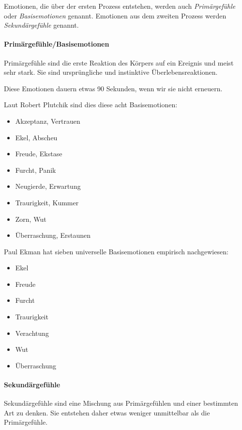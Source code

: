 Emotionen, die über der ersten Prozess entstehen, werden auch \emph{Primärgefühle} oder \emph{Basisemotionen} genannt. Emotionen aus dem zweiten Prozess werden \emph{Sekundärgefühle} genannt.


\paragraph{Primärgefühle/Basisemotionen}

Primärgefühle sind die erste Reaktion des Körpers auf ein Ereignis und meist sehr stark. Sie sind ursprüngliche und instinktive Überlebensreaktionen.

Diese Emotionen dauern etwas 90 Sekunden, wenn wir sie nicht \glqq erneuern\grqq.

Laut Robert Plutchik\cite{plutchik-emotions} sind dies diese acht Basisemotionen:

\begin{itemize}
  \item Akzeptanz, Vertrauen
  \item Ekel, Abscheu
  \item Freude, Ekstase
  \item Furcht, Panik
  \item Neugierde, Erwartung
  \item Traurigkeit, Kummer
  \item Zorn, Wut
  \item Überraschung, Erstaunen
\end{itemize}

Paul Ekman\cite{ekman-emotions} hat sieben universelle Basisemotionen empirisch nachgewiesen:

\begin{itemize}
  \item Ekel
  \item Freude
  \item Furcht
  \item Traurigkeit
  \item Verachtung
  \item Wut
  \item Überraschung
\end{itemize}

\paragraph{Sekundärgefühle}

Sekundärgefühle sind eine Mischung aus Primärgefühlen und einer bestimmten Art zu denken. Sie entstehen daher etwas weniger unmittelbar als die Primärgefühle.

